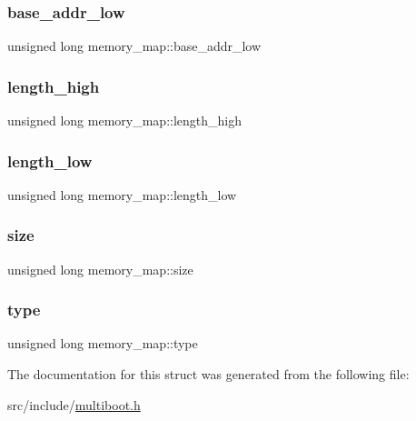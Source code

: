 \subsubsection{\texorpdfstring{base\+\_\+addr\+\_\+low}{base\_addr\_low}}
{\footnotesize\ttfamily unsigned long memory\+\_\+map\+::base\+\_\+addr\+\_\+low}

\mbox{\label{structmemory__map_acda914c5b912796f320848c0ba36eed3}} 
\subsubsection{\texorpdfstring{length\+\_\+high}{length\_high}}
{\footnotesize\ttfamily unsigned long memory\+\_\+map\+::length\+\_\+high}

\mbox{\label{structmemory__map_a8498847818d49c539c0d2c9c8abedc90}} 
\subsubsection{\texorpdfstring{length\+\_\+low}{length\_low}}
{\footnotesize\ttfamily unsigned long memory\+\_\+map\+::length\+\_\+low}

\mbox{\label{structmemory__map_a7cc9c671b3fce55df7da566cee83c788}} 
\subsubsection{\texorpdfstring{size}{size}}
{\footnotesize\ttfamily unsigned long memory\+\_\+map\+::size}

\mbox{\label{structmemory__map_aa133383a0820f52669530f483d2a8d14}} 
\subsubsection{\texorpdfstring{type}{type}}
{\footnotesize\ttfamily unsigned long memory\+\_\+map\+::type}



The documentation for this struct was generated from the following file\+:\begin{DoxyCompactItemize}
\item 
src/include/\hyperlink{multiboot_8h}{multiboot.\+h}\end{DoxyCompactItemize}
